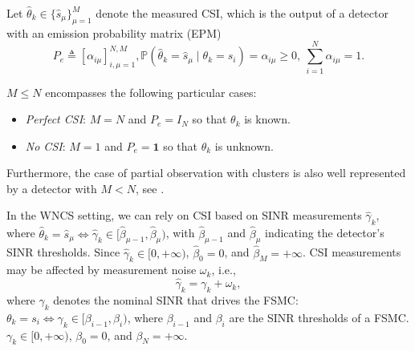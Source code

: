 \documentclass[journal,twoside,web]{ieeecolor}
\begin{document}
Let $\hat{\theta}_k \in \{\hat{s}_{\mu}\}_{\mu=1}^{M}$ denote the measured CSI, which is the output of a detector with an emission probability matrix (EPM)
\begin{subequations}\label{eq:epm-alpha}
\begin{equation}\label{eq:epm}
    P_{e}^{} \triangleq \left[\alpha_{i\mu}\right]_{i,\mu=1}^{N,M},
\end{equation}
\begin{equation}\label{eq:alpha}
   \mathbb{P}(\hat{\theta}_{k} = \hat{s}_{\mu} \mid \theta_{k} = s_i) = \alpha_{i\mu} \geq 0,~ \sum_{i=1}^N \alpha_{i\mu}= 1.
\end{equation}
\end{subequations}

$M\leq N$ encompasses the following particular cases:
\begin{itemize}
    \item \emph{Perfect CSI}: $M=N$ and $P_e = I_N$ so that %
    $\theta_k$ is known.
    \item \emph{No CSI}: $M=1$ and $P_e = \mathbf{1}$ so that $\theta_k$ is unknown.
\end{itemize}
Furthermore, the case of partial observation with clusters is also well represented by a detector with $M<N$, see \cite{costa2015detector}.

In the WNCS setting, we can rely on CSI based on SINR measurements $\hat{\gamma}_k$, where $\hat{\theta}_k = \hat{s}_{\mu} \Leftrightarrow\hat{\gamma}_k\in [\hat{\beta}_{\mu-1},\hat{\beta}_{\mu})$, with $\hat{\beta}_{\mu-1}$ and $\hat{\beta}_{\mu}$ indicating the detector's SINR thresholds. Since $\hat{\gamma}_k \in [0,+\infty)$, $\hat{\beta}_0 = 0$, and $\hat{\beta}_{M}=+\infty$. CSI measurements may be affected by measurement noise $\omega_k$, i.e., 
\begin{equation}\label{eq:gamma-hat}
    \hat{\gamma}_k = \gamma_k + \omega_k,
\end{equation}
where $\gamma_k$ denotes the nominal SINR that drives the FSMC: 
$\theta_k = s_{i} \Leftrightarrow\gamma_k\in [\beta_{i-1},\beta_{i})$, where $\beta_{i-1}$ and $\beta_{i}$ are the SINR thresholds of a FSMC. $\gamma_k \in [0,+\infty)$, $\beta_0 = 0$, and $\beta_{N}=+\infty$.
\end{document}
